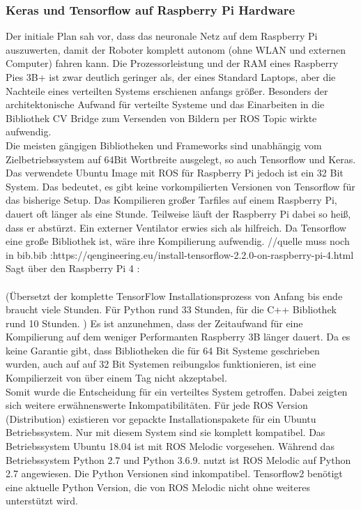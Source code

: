 \documentclass[conference]{IEEEtran}
\begin{document}
	\subsubsection{Keras und Tensorflow auf Raspberry Pi Hardware}
	Der initiale Plan sah vor, dass das neuronale Netz auf dem Raspberry Pi 
	auszuwerten, damit der Roboter komplett autonom (ohne WLAN und 
	externen Computer) fahren kann. Die Prozessorleistung und der RAM 
	eines Raspberry Pies 3B+ ist zwar deutlich geringer als, der eines 
	Standard Laptops, aber die Nachteile eines verteilten Systems erschienen 
	anfangs größer. Besonders der architektonische Aufwand für  verteilte 
	Systeme und das Einarbeiten in die Bibliothek CV Bridge zum Versenden 
	von Bildern per ROS Topic wirkte aufwendig. \\
	Die meisten gängigen Bibliotheken und Frameworks sind unabhängig vom 
	Zielbetriebssystem auf 64Bit Wortbreite ausgelegt, so auch Tensorflow 
	und Keras. Das verwendete Ubuntu Image mit ROS für Raspberry Pi 
	jedoch ist ein 32 Bit System. Das bedeutet, es gibt keine vorkompilierten 
	Versionen von Tensorflow für das bisherige Setup. Das Kompilieren 
	großer Tarfiles auf einem Raspberry Pi, dauert oft länger als eine Stunde. 
	Teilweise läuft der Raspberry Pi dabei so heiß, dass er abstürzt. Ein 
	externer Ventilator erwies sich als hilfreich.  Da Tensorflow  eine große 
	Bibliothek ist, wäre ihre Kompilierung aufwendig.
	//quelle muss noch in bib.bib 
	:https://qengineering.eu/install-tensorflow-2.2.0-on-raspberry-pi-4.html
	Sagt über den Raspberry Pi 4   : \\
	 \\
	(Übersetzt der komplette TensorFlow Installationsprozess von Anfang bis 
	ende braucht viele Stunden. Für Python rund 33 Stunden, für die C++ 
	Bibliothek rund 10 Stunden. )
	Es ist  anzunehmen, dass der Zeitaufwand für eine Kompilierung auf dem 
	weniger Performanten Raspberry 3B länger dauert. Da es keine Garantie 
	gibt, dass Bibliotheken die für  64 Bit Systeme geschrieben wurden, auch 
	auf auf 32 Bit Systemen reibungslos funktionieren, ist eine Kompilierzeit 
	von über einem Tag nicht akzeptabel. \\
	
Somit wurde die Entscheidung für ein verteiltes System getroffen. Dabei 
zeigten sich weitere erwähnenswerte Inkompatibilitäten. Für jede ROS 
Version (Distribution) existieren vor gepackte Installationspakete für ein 
Ubuntu Betriebssystem. Nur mit diesem System sind sie komplett 
kompatibel. Das Betriebssystem Ubuntu 18.04 ist mit ROS Melodic 
vorgesehen. Während das Betriebssystem Python 2.7 und Python 3.6.9. 
nutzt ist ROS Melodic auf Python 2.7 angewiesen. Die Python Versionen sind 
inkompatibel. Tensorflow2 benötigt eine aktuelle Python Version, die von 
ROS Melodic nicht ohne weiteres unterstützt wird. \\
\end{document}
